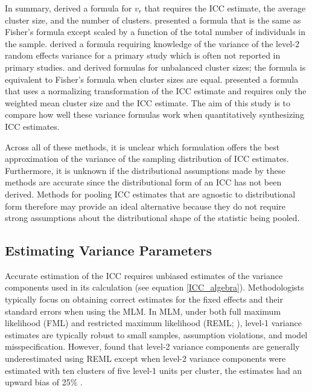 In summary,  derived a formula for $v_r$ that requires the ICC estimate, the average cluster size, and the number of clusters.  presented a formula that is the same as Fisher’s formula except scaled by a function of the total number of individuals in the sample.  derived a formula requiring knowledge of the variance of the level-2 random effects variance for a primary study which is often not reported in primary studies.  and  derived formulas for unbalanced cluster sizes; the  formula is equivalent to Fisher’s formula when cluster sizes are equal.  presented a formula that uses a normalizing transformation of the ICC estimate and requires only the weighted mean cluster size and the ICC estimate. The aim of this study is to compare how well these variance formulas work when quantitatively synthesizing ICC estimates. 

Across all of these methods, it is unclear which formulation offers the best approximation of the variance of the sampling distribution of ICC estimates. Furthermore, it is unknown if the distributional assumptions made by these methods are accurate since the distributional form of an ICC has not been derived. Methods for pooling ICC estimates that are agnostic to distributional form therefore may provide an ideal alternative because they do not require strong assumptions about the distributional shape of the statistic being pooled. 

\subsection{Estimating Variance Parameters}
Accurate estimation of the ICC requires unbiased estimates of the variance components used in its calculation (see equation \ref{ICC_algebra}). Methodologists typically focus on obtaining correct estimates for the fixed effects and their standard errors when using the MLM. In MLM, under both full maximum likelihood (FML) and restricted maximum likelihood (REML; \cite{corbeil1976}), level-1 variance estimates are typically robust to small samples, assumption violations, and model misspecification. However,  found that level-2 variance components are generally underestimated using REML except when level-2 variance components were estimated with ten clusters of five level-1 units per cluster, the estimates had an upward bias of 25\% \cite{maas2005, mcneish2016}.


